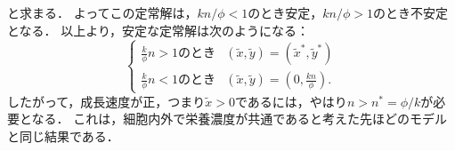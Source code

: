と求まる．
よってこの定常解は，$kn/\phi < 1$のとき安定，$kn/\phi > 1$のとき不安定となる．
以上より，安定な定常解は次のようになる：
\begin{equation}
  \begin{cases}
    \frac{k}{\phi} n > 1 \text{のとき} & (\tilde{x},\tilde{y}) = \left(\tilde{x}^*, \tilde{y}^*\right) \\
    \frac{k}{\phi} n < 1 \text{のとき} & (\tilde{x},\tilde{y}) = \left(0, \frac{kn}{\phi}\right).
  \end{cases}
\end{equation}
したがって，成長速度が正，つまり$\tilde{x} > 0$であるには，やはり$n > n^* = \phi/k$が必要となる．
これは，細胞内外で栄養濃度が共通であると考えた先ほどのモデルと同じ結果である．
